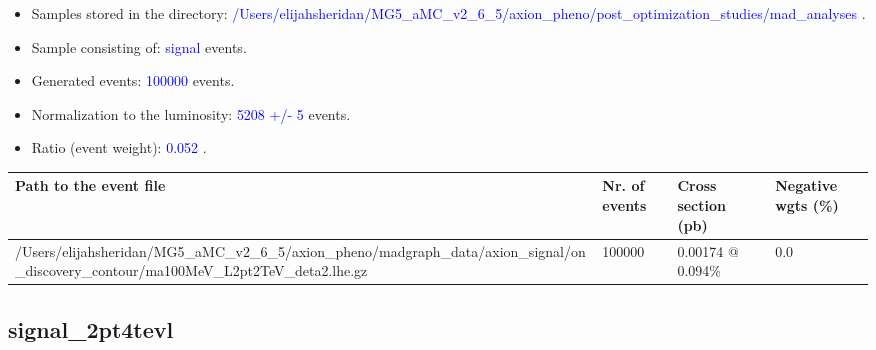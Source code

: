 \documentclass[a4paper, 10pt]{article}
\begin{document}
\begin{itemize}
  \item Samples stored in the directory: \textcolor{blue}{/\-Users/\-elijahsheridan/\-MG5\_aMC\_v2\_6\_5/\-axion\_pheno/\-post\_optimization\_studies/\-mad\_analyses} .
   \item Sample consisting of: \textcolor{blue}{signal}  events.
   \item Generated events: \textcolor{blue}{100000 }  events.
   \item Normalization to the luminosity: \textcolor{blue}{5208}\textcolor{blue}{ +/\-- }\textcolor{blue}{5 }  events.
   \item Ratio (event weight): \textcolor{blue}{0.052 } .  
 
\end{itemize}
\begin{table}[H]
  \begin{center}
    \begin{tabular}{|m{55.0mm}|m{25.0mm}|m{30.0mm}|m{30.0mm}|}
      \hline
      {\cellcolor{yellow}         Path to the event file}& {\cellcolor{yellow}         Nr. of events}& {\cellcolor{yellow}         Cross section (pb)}& {\cellcolor{yellow}         Negative wgts (\%)}\\
      \hline
      {\cellcolor{white}          /\-Users/\-elijahsheridan/\-MG5\_aMC\_v2\_6\_5/\-axion\_pheno/\-madgraph\_data/\-axion\_signal/\-on\_discovery\_contour/\-ma100MeV\_L2pt2TeV\_deta2.lhe.gz}& {\cellcolor{white}          100000}& {\cellcolor{white}          0.00174 @ 0.094\%}& {\cellcolor{white}          0.0}\\
\hline
    \end{tabular}
  \end{center}
\end{table}

\subsection{ signal\_2pt4tevl}
\end{document}
